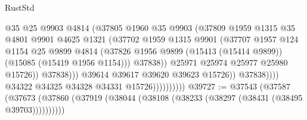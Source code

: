 \begin{lexlean}{RustStd}
\begin{coremodule}
                                          @35
                                          @25
                                          @9903
                                          @4814
                                          (@37805
                                            @1960
                                            @35
                                            @9903
                                            (@37809
                                              @1959
                                              @1315
                                              @35
                                              @4801
                                              @9901
                                              @4625
                                              @1321
                                              (@37702
                                                @1959
                                                @1315
                                                @9901
                                                (@37707
                                                  @1957
                                                  @124
                                                  @1154
                                                  @25
                                                  @9899
                                                  @4814
                                                  (@37826
                                                    @1956
                                                    @9899
                                                    (@15413 (@15414 @9899))
                                                    (@15085 (@15419 @1956 @1154)))
                                                  @37838))
                                              @25971
                                              @25974
                                              @25977
                                              @25980
                                              @15726))
                                          @37838)))
                                    @39614
                                    @39617
                                    @39620
                                    @39623
                                    @15726))
                                @37838))))
                        @34322
                        @34325
                        @34328
                        @34331
                        @15726))))))))))
@39727 := @37543
    (@37587 (@37673 (@37860 (@37919 (@38044 (@38108 (@38233 (@38297 (@38431 (@38495 @39703))))))))))

\end{coremodule}
\end{lexlean}
